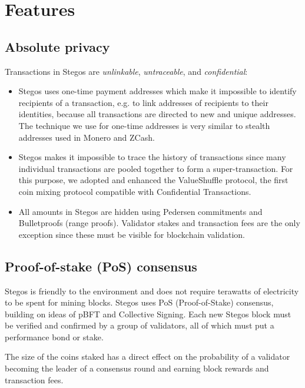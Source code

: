 \documentclass[a4paper, 10pt, conference]{ieeeconf}
\begin{document}
\section{Features}

\subsection{Absolute privacy}
Transactions in Stegos are \textit{unlinkable}, \textit{untraceable}, and \textit{confidential}:

\begin{itemize}
	\item {Stegos uses one-time payment addresses which make it impossible to identify recipients of a transaction, e.g. to link addresses of recipients to their identities, because all transactions are directed to new and unique addresses. The technique we use for one-time addresses is very similar to stealth addresses used in Monero and ZCash.}
	\item {Stegos makes it impossible to trace the history of transactions since many individual transactions are pooled together to form a super-transaction. For this purpose, we adopted and enhanced the ValueShuffle protocol\cite{c7}, the first coin mixing protocol compatible with Confidential Transactions.}
	\item {All amounts in Stegos are hidden using Pedersen commitments\cite{c8} and Bulletproofs (range proofs)\cite{c4}. Validator stakes and transaction fees are the only exception since these must be visible for blockchain validation.}
\end{itemize}

\subsection{Proof-of-stake (PoS) consensus}
Stegos is friendly to the environment and does not require terawatts of electricity to be spent for mining blocks. Stegos uses PoS (Proof-of-Stake) consensus, building on ideas of pBFT\cite{c9} and Collective Signing\cite{c10}\cite{c11}. Each new Stegos block must be verified and confirmed by a group of validators, all of which must put a performance bond or stake.

The size of the coins staked has a direct effect on the probability of a validator becoming the leader of a consensus round and earning block rewards and transaction fees.
\end{document}

